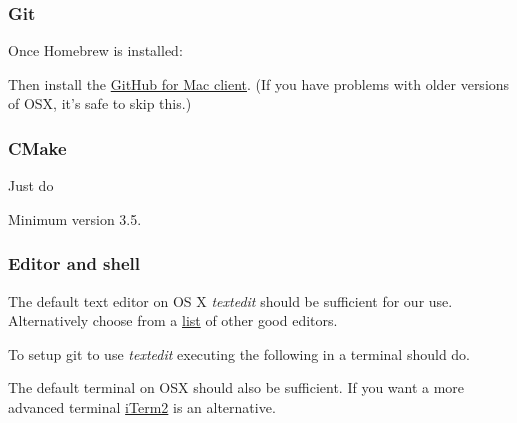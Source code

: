 \subsubsection{Git}\label{git-3}

Once Homebrew is installed:

\begin{Shaded}
\begin{Highlighting}[]
 
\end{Highlighting}
\end{Shaded}

Then install the \href{http://mac.github.com}{GitHub for Mac client}.
(If you have problems with older versions of OSX, it's safe to skip
this.)

\subsubsection{CMake}\label{cmake-3}

Just do

\begin{Shaded}
\begin{Highlighting}[]
 
\end{Highlighting}
\end{Shaded}

Minimum version 3.5.

\subsubsection{Editor and shell}\label{editor-and-shell-1}

The default text editor on OS X \emph{textedit} should be sufficient for
our use. Alternatively choose from a
\href{http://mac.appstorm.net/roundups/office-roundups/top-10-mac-text-editors/}{list}
of other good editors.

To setup git to use \emph{textedit} executing the following in a
terminal should do.

\begin{Shaded}
\begin{Highlighting}[]
 
\end{Highlighting}
\end{Shaded}

The default terminal on OSX should also be sufficient. If you want a
more advanced terminal \href{http://www.iterm2.com/}{iTerm2} is an
alternative.

